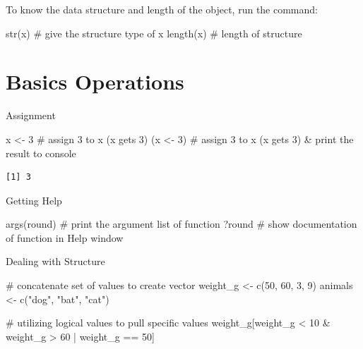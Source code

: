 \documentclass[
  letterpaper,
  DIV=11,
  numbers=noendperiod]{scrreprt}
\newenvironment{Shaded}{\begin{snugshade}}{\end{snugshade}}
\newcommand{\CommentTok}[1]{\textcolor[rgb]{0.37,0.37,0.37}{#1}}
\newcommand{\DecValTok}[1]{\textcolor[rgb]{0.68,0.00,0.00}{#1}}
\newcommand{\FunctionTok}[1]{\textcolor[rgb]{0.28,0.35,0.67}{#1}}
\newcommand{\NormalTok}[1]{\textcolor[rgb]{0.00,0.23,0.31}{#1}}
\newcommand{\OtherTok}[1]{\textcolor[rgb]{0.00,0.23,0.31}{#1}}
\newcommand{\SpecialCharTok}[1]{\textcolor[rgb]{0.37,0.37,0.37}{#1}}
\newcommand{\StringTok}[1]{\textcolor[rgb]{0.13,0.47,0.30}{#1}}
\begin{document}
To know the data structure and length of the object, run the command:

\begin{Shaded}
\begin{Highlighting}[]
\FunctionTok{str}\NormalTok{(x) }\CommentTok{\# give the structure type of x}
\FunctionTok{length}\NormalTok{(x) }\CommentTok{\# length of structure}
\end{Highlighting}
\end{Shaded}

\section{Basics Operations}\label{basics-operations}

Assignment

\begin{Shaded}
\begin{Highlighting}[]
\NormalTok{x }\OtherTok{\textless{}{-}} \DecValTok{3} \CommentTok{\# assign 3 to x (x gets 3)}
\NormalTok{(x }\OtherTok{\textless{}{-}} \DecValTok{3}\NormalTok{) }\CommentTok{\# assign 3 to x (x gets 3) \& print the result to console}
\end{Highlighting}
\end{Shaded}

\begin{verbatim}
[1] 3
\end{verbatim}

Getting Help

\begin{Shaded}
\begin{Highlighting}[]
\FunctionTok{args}\NormalTok{(round) }\CommentTok{\# print the argument list of function}
\NormalTok{?round }\CommentTok{\# show documentation of function in Help window}
\end{Highlighting}
\end{Shaded}

Dealing with Structure

\begin{Shaded}
\begin{Highlighting}[]
\CommentTok{\# concatenate set of values to create vector}
\NormalTok{weight\_g }\OtherTok{\textless{}{-}} \FunctionTok{c}\NormalTok{(}\DecValTok{50}\NormalTok{, }\DecValTok{60}\NormalTok{, }\DecValTok{3}\NormalTok{, }\DecValTok{9}\NormalTok{)}
\NormalTok{animals }\OtherTok{\textless{}{-}} \FunctionTok{c}\NormalTok{(}\StringTok{"dog"}\NormalTok{, }\StringTok{"bat"}\NormalTok{, }\StringTok{"cat"}\NormalTok{)}

\CommentTok{\# utilizing logical values to pull specific values}
\NormalTok{weight\_g[weight\_g }\SpecialCharTok{\textless{}} \DecValTok{10} \SpecialCharTok{\&}\NormalTok{ weight\_g }\SpecialCharTok{\textgreater{}} \DecValTok{60} \SpecialCharTok{|}\NormalTok{ weight\_g }\SpecialCharTok{==} \DecValTok{50}\NormalTok{]}
\end{Highlighting}
\end{Shaded}
\end{document}

